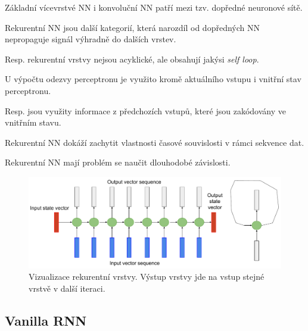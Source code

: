 \begin{compactitem}
    \item Základní vícevrstvé NN i konvoluční NN patří mezi tzv. dopředné neuronové sítě.

    \item Rekurentní NN jsou další kategorií, která narozdíl od dopředných NN nepropaguje signál výhradně do dalších vrstev. \begin{compactitem}
        \item Resp. rekurentní vrstvy nejsou acyklické, ale obsahují jakýsi \textit{self loop}.
    \end{compactitem}


    \item U výpočtu odezvy perceptronu je využito kromě aktuálního vstupu i vnitřní stav perceptronu. \begin{compactitem}
        \item
        Resp. jsou využity informace z předchozích vstupů, které jsou zakódovány ve vnitřním stavu.
    \end{compactitem}

    \item Rekurentní NN dokáží zachytit vlastnosti časové souvislosti v rámci sekvence dat.

    \item Rekurentní NN mají problém se naučit dlouhodobé závislosti.
\end{compactitem}

\begin{figure}[H]
    \centering
    \includegraphics[width=1\linewidth]{recurrent.pdf}
    \caption{Vizualizace rekurentní vrstvy. Výstup vrstvy jde na vstup stejné vrstvě v další iteraci.}
\end{figure}

\subsection{Vanilla RNN}

